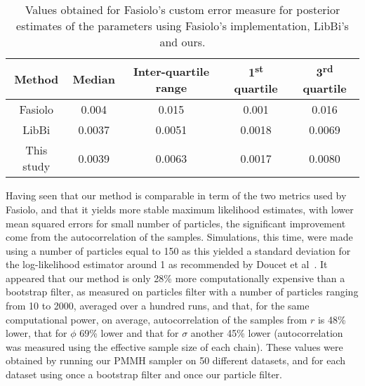 \documentclass[12pt]{article}
\newcommand{\ra}[1]{\renewcommand{\arraystretch}{#1}}
\begin{document}
	\begin{table}[htb]
		\centering
		\vspace{10mm}
		\ra{1.3}
		\begin{tabular}{@{}ccccc@{}} \toprule
			Method & Median &  Inter-quartile range & 1\textsuperscript{st} quartile & 3\textsuperscript{rd} quartile \\ \midrule 
			Fasiolo & 0.004 & 0.015 & 0.001 & 0.016\\ 
			LibBi & 0.0037 & 0.0051 & 0.0018 & 0.0069 \\ 
			This study & 0.0039 &  0.0063 & 0.0017 & 0.0080\\ \bottomrule
		\end{tabular}
		\caption[Comparison between Fasiolo's custom error measure for posterior estimates of the parameters obtain in this study and in Fasiolo's ]{Values obtained for Fasiolo's custom error measure for posterior estimates of the parameters using Fasiolo's implementation, LibBi's and ours.}
		\label{table:metric}
	\end{table}
	
\clearpage
	Having seen that our method is comparable in term of the two metrics used by Fasiolo, and that it yields more stable maximum likelihood estimates, with lower mean squared errors for small number of particles, the significant improvement come from the autocorrelation of the samples. Simulations, this time, were made using a number of particles equal to 150 as this yielded a standard deviation for the log-likelihood estimator around 1 as recommended by Doucet et al~\cite{doucet2015efficient}. It appeared that our method is only 28\% more computationally expensive than a bootstrap filter, as measured on particles filter with a number of particles ranging from 10 to 2000, averaged over a hundred runs, and that, for the same computational power, on average, autocorrelation of the samples from $r$ is 48\% lower, that for $\phi$ 69\% lower and that for $\sigma$ another 45\% lower (autocorrelation was measured using the effective sample size of each chain). These values were obtained by running our PMMH sampler on 50 different datasets, and for each dataset using once a bootstrap filter and once our particle filter.
	
\end{document}
